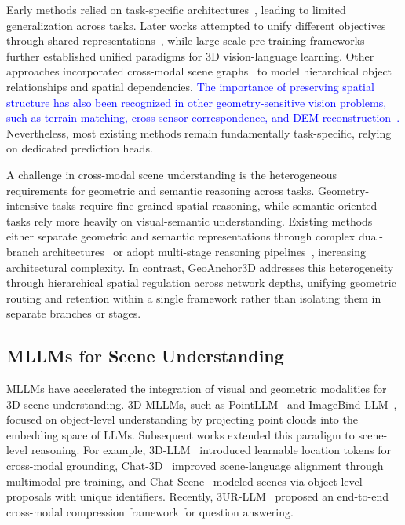 \documentclass[lettersize,journal]{IEEEtran}
\begin{document}
Early methods relied on task-specific architectures~\cite{scanrefer2020, scan2cap2021}, leading to limited generalization across tasks. Later works attempted to unify different objectives through shared representations~\cite{3djcg2022, d3net2022}, while large-scale pre-training frameworks~\cite{3dvlp2023, 3dvista2023} further established unified paradigms for 3D vision-language learning. Other approaches incorporated cross-modal scene graphs~\cite{wei20243dsgg, feng2025hierarchical} to model hierarchical object relationships and spatial dependencies. \textcolor{blue}{The importance of preserving spatial structure has also been recognized in other geometry-sensitive vision problems, such as terrain matching, cross-sensor correspondence, and DEM reconstruction~\cite{huang2026underwater, gao2026arctic, huang2026contourlet}.} Nevertheless, most existing methods remain fundamentally task-specific, relying on dedicated prediction heads.

A challenge in cross-modal scene understanding is the heterogeneous requirements for geometric and semantic reasoning across tasks. Geometry-intensive tasks require fine-grained spatial reasoning, while semantic-oriented tasks rely more heavily on visual-semantic understanding. Existing methods either separate geometric and semantic representations through complex dual-branch architectures~\cite{spatial-mllm2025} or adopt multi-stage reasoning pipelines~\cite{scenecot2025}, increasing architectural complexity. In contrast, GeoAnchor3D addresses this heterogeneity through hierarchical spatial regulation across network depths, unifying geometric routing and retention within a single framework rather than isolating them in separate branches or stages.

\subsection{MLLMs for Scene Understanding}
MLLMs have accelerated the integration of visual and geometric modalities for 3D scene understanding. 3D MLLMs, such as PointLLM~\cite{pointllm2024} and ImageBind-LLM~\cite{imagebindllm}, focused on object-level understanding by projecting point clouds into the embedding space of LLMs. Subsequent works extended this paradigm to scene-level reasoning. For example, 3D-LLM~\cite{3dllm2023} introduced learnable location tokens for cross-modal grounding, Chat-3D~\cite{chat3d2023} improved scene-language alignment through multimodal pre-training, and Chat-Scene~\cite{chatscene2024} modeled scenes via object-level proposals with unique identifiers. Recently, 3UR-LLM~\cite{xiong20253urllm} proposed an end-to-end cross-modal compression framework for question answering.
\end{document}
